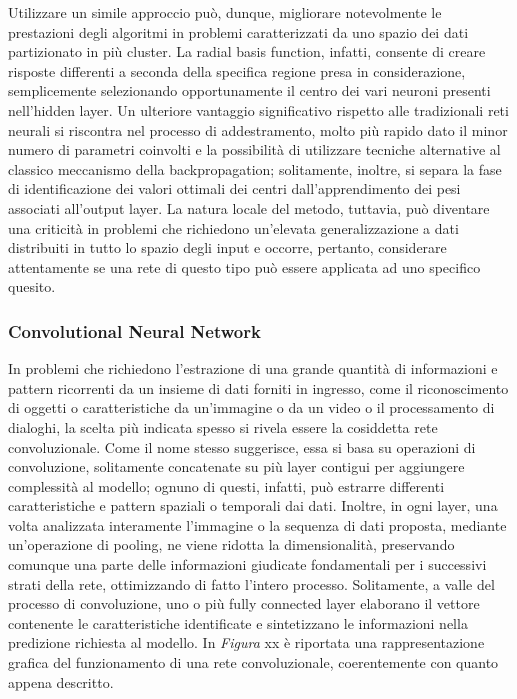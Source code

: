 Utilizzare un simile approccio può, dunque, migliorare notevolmente le prestazioni degli algoritmi in problemi caratterizzati da uno spazio dei dati partizionato in più cluster. La radial basis function, infatti, consente di creare risposte differenti a seconda della specifica regione presa in considerazione, semplicemente selezionando opportunamente il centro dei vari neuroni presenti nell'hidden layer. Un ulteriore vantaggio significativo rispetto alle tradizionali reti neurali si riscontra nel processo di addestramento, molto più rapido dato il minor numero di parametri coinvolti e la possibilità di utilizzare tecniche alternative al classico meccanismo della backpropagation; solitamente, inoltre, si separa la fase di identificazione dei valori ottimali dei centri dall'apprendimento dei pesi associati all'output layer. La natura locale del metodo, tuttavia, può diventare una criticità in problemi che richiedono un'elevata generalizzazione a dati distribuiti in tutto lo spazio degli input e occorre, pertanto, considerare attentamente se una rete di questo tipo può essere applicata ad uno specifico quesito. 

\subsubsection{Convolutional Neural Network}

In problemi che richiedono l'estrazione di una grande quantità di informazioni e pattern ricorrenti da un insieme di dati forniti in ingresso, come il riconoscimento di oggetti o caratteristiche da un'immagine o da un video o il processamento di dialoghi, la scelta più indicata spesso si rivela essere la cosiddetta rete convoluzionale. Come il nome stesso suggerisce, essa si basa su operazioni di convoluzione, solitamente concatenate su più layer contigui per aggiungere complessità al modello; ognuno di questi, infatti, può estrarre differenti caratteristiche e pattern spaziali o temporali dai dati. Inoltre, in ogni layer, una volta analizzata interamente l'immagine o la sequenza di dati proposta, mediante un'operazione di pooling, ne viene ridotta la dimensionalità, preservando comunque una parte delle informazioni giudicate fondamentali per i successivi strati della rete, ottimizzando di fatto l'intero processo. Solitamente, a valle del processo di convoluzione, uno o più fully connected layer elaborano il vettore contenente le caratteristiche identificate e sintetizzano le informazioni nella predizione richiesta al modello. In \emph{Figura} xx è riportata una rappresentazione grafica del funzionamento di una rete convoluzionale, coerentemente con quanto appena descritto.

